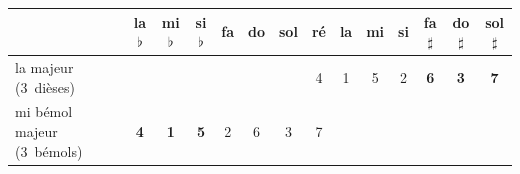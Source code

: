 
{\small\setlength{\tabcolsep}{4.2pt}%
\begin{tabular}{@{}l*{13}{c}@{}}
\toprule
 & la$\flat$ & mi$\flat$ & si$\flat$ & fa & do & sol & ré & la & mi & si & fa$\sharp$ & do$\sharp$ & sol$\sharp$ \\
\midrule
la majeur (3~dièses) &  &  &  &  &  &  & 4 & 1 & 5 & 2 & \textbf{6} & \textbf{3} & \textcolor{accent}{\textbf{7}} \\
mi bémol majeur (3~bémols) & \textcolor{accent}{\textbf{4}} & \textcolor{accent}{\textbf{1}} & \textbf{5} & 2 & 6 & 3 & 7 &  &  &  &  &  &  \\
\bottomrule
\end{tabular}}

